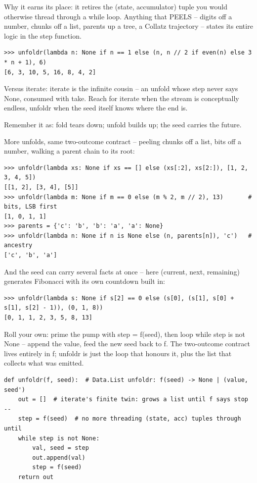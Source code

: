 \documentclass[11pt,letterpaper]{book}
\begin{document}
Why it earns its place: it retires the (state, accumulator) tuple you would otherwise thread through a while loop. Anything that PEELS -- digits off a number, chunks off a list, parents up a tree, a Collatz trajectory -- states its entire logic in the step function.

\begin{lstlisting}[style=spec]
>>> unfoldr(lambda n: None if n == 1 else (n, n // 2 if even(n) else 3 * n + 1), 6)
[6, 3, 10, 5, 16, 8, 4, 2]
\end{lstlisting}

Versus iterate: iterate is the infinite cousin -- an unfold whose step never says None, consumed with take. Reach for iterate when the stream is conceptually endless, unfoldr when the seed itself knows where the end is.


Remember it as: fold tears down; unfold builds up; the seed carries the future.


More unfolds, same two-outcome contract -- peeling chunks off a list, bits off a number, walking a parent chain to its root:

\begin{lstlisting}[style=spec]
>>> unfoldr(lambda xs: None if xs == [] else (xs[:2], xs[2:]), [1, 2, 3, 4, 5])
[[1, 2], [3, 4], [5]]
>>> unfoldr(lambda m: None if m == 0 else (m % 2, m // 2), 13)       # bits, LSB first
[1, 0, 1, 1]
>>> parents = {'c': 'b', 'b': 'a', 'a': None}
>>> unfoldr(lambda n: None if n is None else (n, parents[n]), 'c')   # ancestry
['c', 'b', 'a']
\end{lstlisting}

And the seed can carry several facts at once -- here (current, next, remaining) generates Fibonacci with its own countdown built in:

\begin{lstlisting}[style=spec]
>>> unfoldr(lambda s: None if s[2] == 0 else (s[0], (s[1], s[0] + s[1], s[2] - 1)), (0, 1, 8))
[0, 1, 1, 2, 3, 5, 8, 13]
\end{lstlisting}

Roll your own: prime the pump with step = f(seed), then loop while step is not None -- append the value, feed the new seed back to f. The two-outcome contract lives entirely in f; unfoldr is just the loop that honours it, plus the list that collects what was emitted.

\begin{lstlisting}[style=code]
def unfoldr(f, seed):  # Data.List unfoldr: f(seed) -> None | (value, seed')
    out = []  # iterate's finite twin: grows a list until f says stop --
    step = f(seed)  # no more threading (state, acc) tuples through until
    while step is not None:
        val, seed = step
        out.append(val)
        step = f(seed)
    return out
\end{lstlisting}
\end{document}
